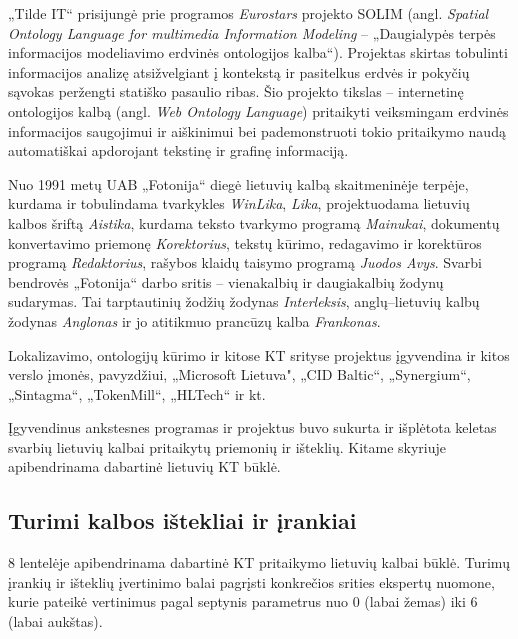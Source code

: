 \begin{multicols}{2}
    „Tilde IT“ prisijungė prie programos \textit{Eurostars} projekto SOLIM (angl. \textit{Spatial Ontology Language for multimedia Information Modeling} – „Daugialypės terpės informacijos modeliavimo erdvinės ontologijos kalba“). Projektas skirtas tobulinti informacijos analizę atsižvelgiant į kontekstą ir pasitelkus erdvės ir pokyčių sąvokas peržengti statiško pasaulio ribas. Šio projekto tikslas – internetinę ontologijos kalbą (angl. \textit{Web Ontology Language}) pritaikyti veiksmingam erdvinės informacijos saugojimui ir aiškinimui bei pademonstruoti tokio pritaikymo naudą automatiškai apdorojant tekstinę ir grafinę informaciją.   

    Nuo 1991 metų UAB „Fotonija“ diegė lietuvių kalbą skaitmeninėje terpėje, kurdama ir tobulindama tvarkykles \textit{WinLika}, \textit{Lika}, projektuodama lietuvių kalbos šriftą \textit{Aistika}, kurdama teksto tvarkymo programą \textit{Mainukai}, dokumentų konvertavimo priemonę \textit{Korektorius}, tekstų kūrimo, redagavimo ir korektūros programą \textit{Redaktorius}, rašybos klaidų taisymo programą \textit{Juodos Avys}. Svarbi bendrovės „Fotonija“ darbo sritis – vienakalbių ir daugiakalbių žodynų sudarymas. Tai tarptautinių žodžių žodynas \textit{Interleksis}, anglų–lietuvių kalbų žodynas \textit{Anglonas} ir jo atitikmuo prancūzų kalba \textit{Frankonas}.   

Lokalizavimo, ontologijų kūrimo ir kitose KT srityse projektus įgyvendina ir kitos verslo įmonės, pavyzdžiui, „Microsoft Lietuva", „CID Baltic“, „Synergium“, „Sintagma“, „TokenMill“, „HLTech“ ir kt. 

Įgyvendinus ankstesnes programas ir projektus buvo sukurta ir išplėtota keletas svarbių lietuvių kalbai pritaikytų priemonių ir išteklių. Kitame skyriuje apibendrinama dabartinė lietuvių KT būklė.

\subsection{Turimi kalbos ištekliai ir įrankiai}

8 lentelėje apibendrinama dabartinė KT pritaikymo lietuvių kalbai būklė. Turimų įrankių ir išteklių įvertinimo balai pagrįsti  konkrečios srities ekspertų nuomone,  kurie pateikė vertinimus pagal septynis parametrus nuo 0 (labai žemas) iki 6 (labai aukštas).


\end{multicols}

